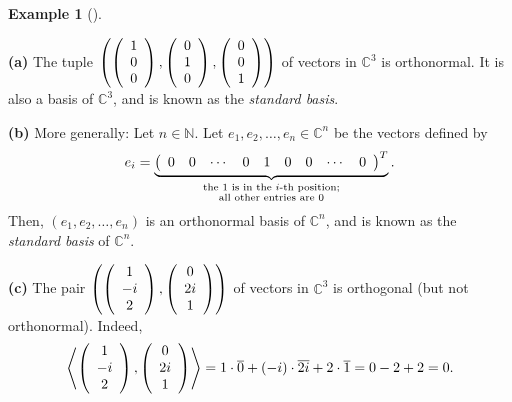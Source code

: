 \documentclass[numbers=enddot,12pt,final,onecolumn,notitlepage]{scrartcl}%
\numberwithin{exer}{subsection}
\theoremstyle{definition}
\newtheorem{exam}[theo]{Example}
\newenvironment{example}[1][]
{\begin{exam}[#1]\begin{leftbar}}
{\end{leftbar}\end{exam}}
\begin{document}
\begin{example}
\textbf{(a)} The tuple $\left(  \left(
\begin{array}
[c]{c}%
1\\
0\\
0
\end{array}
\right)  ,\left(
\begin{array}
[c]{c}%
0\\
1\\
0
\end{array}
\right)  ,\left(
\begin{array}
[c]{c}%
0\\
0\\
1
\end{array}
\right)  \right)  $ of vectors in $\mathbb{C}^{3}$ is orthonormal. It is also
a basis of $\mathbb{C}^{3}$, and is known as the \emph{standard basis}.
\medskip

\textbf{(b)} More generally: Let $n\in\mathbb{N}$. Let $e_{1},e_{2}%
,\ldots,e_{n}\in\mathbb{C}^{n}$ be the vectors defined by%
\[
e_{i}=\underbrace{\left(
\begin{array}
[c]{ccccccccc}%
0 & 0 & \cdots & 0 & 1 & 0 & 0 & \cdots & 0
\end{array}
\right)  ^{T}}_{\substack{\text{the }1\text{ is in the }i\text{-th
position;}\\\text{all other entries are }0}}.
\]
Then, $\left(  e_{1},e_{2},\ldots,e_{n}\right)  $ is an orthonormal basis of
$\mathbb{C}^{n}$, and is known as the \emph{standard basis} of $\mathbb{C}%
^{n}$. \medskip

\textbf{(c)} The pair $\left(  \left(
\begin{array}
[c]{c}%
1\\
-i\\
2
\end{array}
\right)  ,\left(
\begin{array}
[c]{c}%
0\\
2i\\
1
\end{array}
\right)  \right)  $ of vectors in $\mathbb{C}^{3}$ is orthogonal (but not
orthonormal). Indeed,%
\[
\left\langle \left(
\begin{array}
[c]{c}%
1\\
-i\\
2
\end{array}
\right)  ,\left(
\begin{array}
[c]{c}%
0\\
2i\\
1
\end{array}
\right)  \right\rangle =1\cdot\overline{0}+\left(  -i\right)  \cdot
\overline{2i}+2\cdot\overline{1}=0-2+2=0.
\]



\end{example}
\end{document}
